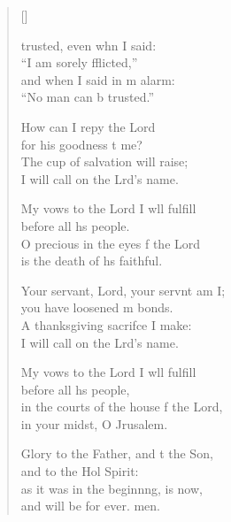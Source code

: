 \settowidth{\versewidth}{in the courts of the house of the Lord,  *}
\begin{verse}[\versewidth]
  \begin{patverse}
     trusted, even whn I said: \Med\\
    “I am sorely fflicted,”\\
    and when I said in m alarm: \Med\\
    “No man can b trusted.”
    
    How can I repy the Lord \Med\\
    for his goodness t me?\\
    The cup of salvation  will raise; \Med\\
    I will call on the Lrd’s name.
    
    My vows to the Lord I w\pointup{\i}ll fulfill \Med\\
    before all h\pointup{\i}s people.\\
    O precious in the eyes f the Lord \Med\\
    is the death of h\pointup{\i}s faithful.

    Your servant, Lord, your servnt am I; \Med\\
    you have loosened m bonds.\\
    A thanksgiving sacrif\pointup{\i}ce I make: \Med\\
    I will call on the Lrd’s name.

    My vows to the Lord I w\pointup{\i}ll fulfill \Med\\
    before all h\pointup{\i}s people,\\
    in the courts of the house f the Lord, \Med\\
    in your midst, O Jrusalem.

    Glory to the Father, and t the Son, \Med\\
    and to the Hol Spirit:\\
    as it was in the beginn\pointup{\i}ng, is now, \Med\\
    and will be for ever. men.
  \end{patverse}
\end{verse}
